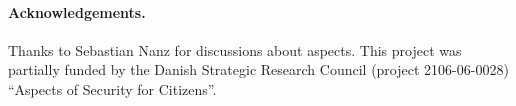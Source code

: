\documentclass[a4paper]{llncs}
\begin{document}

\paragraph{Acknowledgements.}
Thanks to Sebastian Nanz for discussions about aspects. This project was
partially funded by the Danish Strategic Research Council (project
2106-06-0028) ``Aspects of Security for Citizens''.




\end{document}
